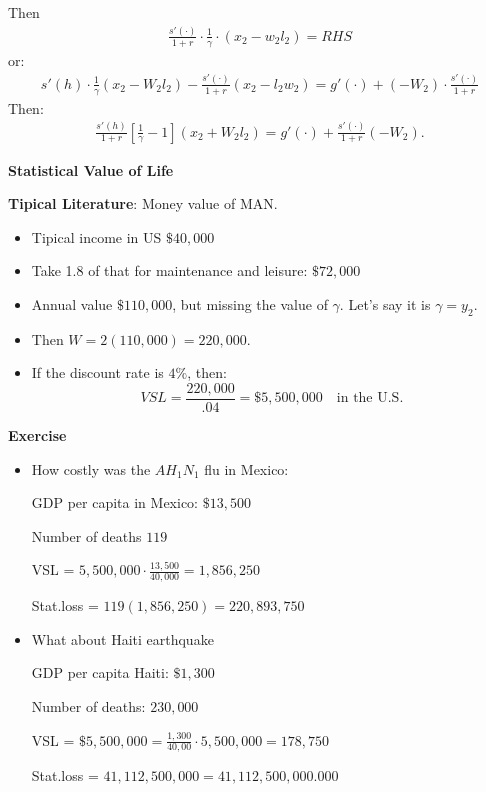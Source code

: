 \documentclass[14pt,notitlepage]{article}
\begin{document}

Then
\begin{align*}
\frac{s'(\cdot)}{1+r} \cdot \frac{1}{\gamma} \cdot (x_2 - w_2 l_2) = RHS
\end{align*}
or:
\begin{align*}
s'(h) \cdot \frac{1}{\gamma} (x_2 - W_2 l_2) - \frac{s'(\cdot)}{1+r} (x_2 - l_2 w_2) = g'(\cdot) + (-W_2) \cdot \frac{s'(\cdot)}{1+r}
\end{align*}
Then:
\begin{align*}
\frac{s'(h)}{1+r} [ \frac{1}{\gamma}-1 ] (x_2 + W_2 l_2) = g'(\cdot) + \frac{s'(\cdot)}{1+r} (-W_2).
\end{align*}

\textbf{Statistical Value of Life}

\textbf{Tipical Literature}: \quad Money value of MAN.
\begin{itemize}
\item Tipical income in US $\$40,000$
\item Take 1.8 of that for maintenance and leisure: $\$72,000$
\item Annual value $\$110,000$, but missing the value of $\gamma$. Let's say it is $\gamma = y_2$.
\item Then $W = 2(110,000) = 220,000$.
\item If the discount rate is $4\%$, then:
\begin{equation*}
VSL = \frac{220,000}{.04} = \$5,500,000 \quad \text{in the U.S.}
\end{equation*}
\end{itemize}

\textbf{Exercise}
\begin{itemize}
\item How costly was the $AH_1N_1$ flu in Mexico:

GDP per capita in Mexico: $\$13,500$

Number of deaths $119$

VSL = $5,500,000 \cdot \frac{13,500}{40,000} = 1,856,250$

Stat.loss = $119(1,856,250) = 220,893,750$

\item What about Haiti earthquake

GDP per capita Haiti: $\$1,300$

Number of deaths: $230,000$

VSL = $\$5,500,000 = \frac{1,300}{40,00} \cdot 5,500,000 = 178,750$

Stat.loss = $41,112,500,000 = 41,112,500,000.000$
\end{itemize}
\end{document}
